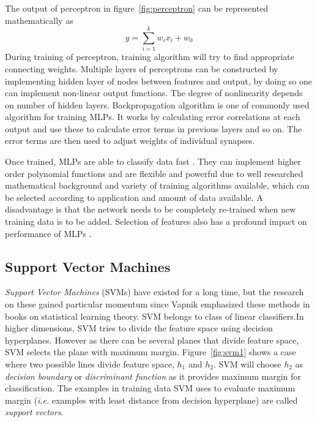 The output of perceptron in figure~\ref{fig:perceptron} can be represented mathematically as
\[ y = \sum\limits_{i=1}^k w_ix_i + w_0 \]
During training of perceptron, training algorithm will try to find appropriate connecting weights. Multiple layers of perceptrons can be constructed by implementing hidden layer of nodes between features and output, by doing so one can implement non-linear output functions. The degree of nonlinearity depends on number of hidden layers. Backpropagation algorithm \cite{Rumelhart1985} is one of commonly used algorithm for training MLPs. It works by calculating error correlations at each output and use these to calculate error terms in previous layers and so on. The error terms are then used to adjust weights of individual synapses.

Once trained, MLPs are able to classify data fast \cite{Alpaydin2004}. They can implement higher order polynomial functions and are flexible and powerful due to well researched mathematical background and variety of training algorithms available, which can be selected according to application and amount of data available. A disadvantage is that the network needs to be completely re-trained when new training data is to be added. Selection of features also has a profound impact on performance of MLPs \cite{Kavzoglu2002, El-Khatib2010}.

\subsection{Support Vector Machines}
\label{mltypes:svm}
\emph{Support Vector Machines} (SVMs) have existed for a long time, but the research on these gained particular momentum since Vapnik \cite{Vapnik1995} emphasized these methods in books on statistical learning theory. SVM belongs to class of linear classifiers.In higher dimensions, SVM tries to divide the feature space using decision hyperplanes. However as there can be several planes that divide feature space, SVM selects the plane with maximum margin. Figure~\ref{fig:svm1} shows a case where two possible lines divide feature space, $h_1$ and $h_2$. SVM will choose $h_2$ as \emph{decision boundary} or \emph{discriminant function} as it provides maximum margin for classification. The examples in training data SVM uses to evaluate maximum margin (\emph{i.e.} examples with least distance from decision hyperplane) are called \emph{support vectors}.

